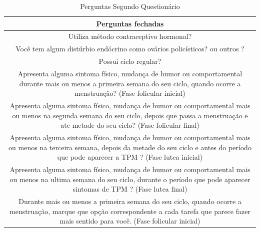 \begin{table}[ht]
    \centering
    \caption{Perguntas Segundo Questionário}
    \label{tab10}
    \begin{tabular}{c}
        \toprule
        \textbf{Perguntas fechadas} \\
        \midrule
        \begin{minipage} [t] {1\textwidth} Utiliza método contraceptivo hormonal?  \end{minipage} \\
        \midrule
        \begin{minipage} [t] {1\textwidth} Você tem algum distúrbio endócrino como ovários policísticos? ou outros ? \end{minipage}\\
        \midrule
        \begin{minipage} [t] {1\textwidth} Possui ciclo regular? \end{minipage} \\
        \midrule
        \begin{minipage} [t] {1\textwidth} Apresenta alguma sintoma físico, mudança de humor ou comportamental durante mais ou menos a primeira semana do seu ciclo, quando ocorre a menstruação? (Fase folicular inicial) \end{minipage}  \\
        \midrule
        \begin{minipage} [t] {1\textwidth} Apresenta alguma sintoma físico, mudança de humor ou comportamental mais ou menos na segunda semana do seu ciclo, depois que passa a menstruação e ate metade do seu ciclo? (Fase folicular final)\end{minipage}\\
        \midrule
        \begin{minipage} [t] {1\textwidth} Apresenta alguma sintoma físico, mudança de humor ou comportamental mais ou menos na terceira semana, depois da metade do seu ciclo e antes do período que pode aparecer a TPM ? (Fase lutea inicial)\end{minipage} \\
        \midrule
        \begin{minipage} [t] {1\textwidth} Apresenta alguma sintoma físico, mudança de humor ou comportamental mais ou menos na ultima semana do seu ciclo, durante o período que pode aparecer sintomas de TPM ? (Fase lutea final)\end{minipage}\\
        \midrule
        \begin{minipage} [t] {1\textwidth} Durante mais ou menos a primeira semana do seu ciclo, quando ocorre a menstruação, marque que opção correspondente a cada tarefa que parece fazer mais sentido para você. (Fase folicular inicial) \end{minipage}\\

\end{tabular}
\end{table}
